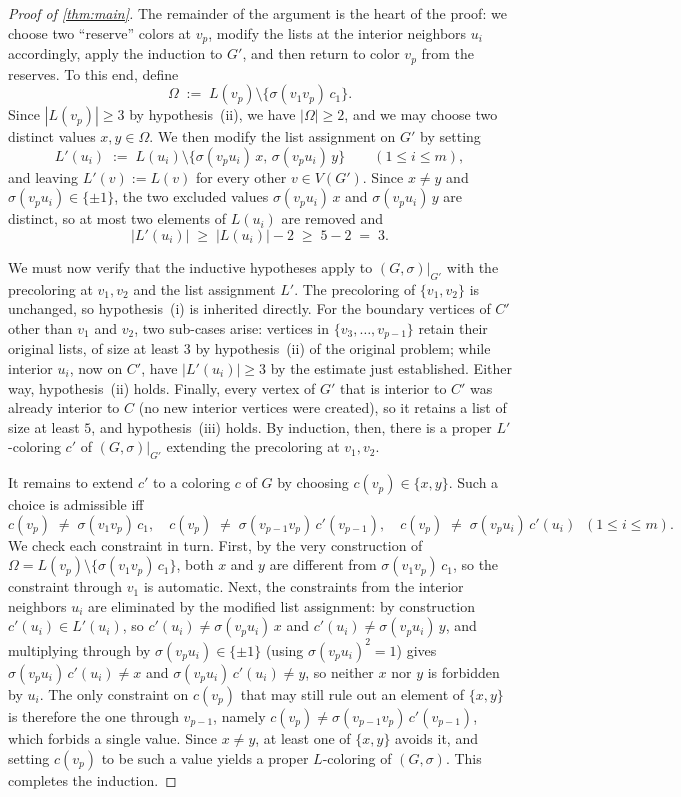 \documentclass[11pt,a4paper]{article}
\theoremstyle{plain}
\theoremstyle{definition}
\newcommand{\V}{V}
\newcommand{\Gs}{(G,\sigma)}
\begin{document}
\begin{proof}[Proof of \cref{thm:main}]
The remainder of the argument is the heart of the proof: we choose
two ``reserve'' colors at $v_p$, modify the lists at the interior
neighbors $u_i$ accordingly, apply the induction to $G'$, and then
return to color $v_p$ from the reserves. To this end, define
\[
   \Omega\;:=\;L(v_p)\setminus\{\sigma(v_1v_p)\,c_1\}.
\]
Since $|L(v_p)|\ge 3$ by hypothesis~(ii), we have $|\Omega|\ge 2$,
and we may choose two distinct values $x,y\in\Omega$. We then
modify the list assignment on $G'$ by setting
\[
   L'(u_i) \;:=\; L(u_i)\setminus\{\sigma(v_pu_i)\,x,\,\sigma(v_pu_i)\,y\}
   \qquad (1\le i\le m),
\]
and leaving $L'(v):=L(v)$ for every other $v\in\V(G')$. Since
$x\ne y$ and $\sigma(v_pu_i)\in\{\pm1\}$, the two excluded values
$\sigma(v_pu_i)\,x$ and $\sigma(v_pu_i)\,y$ are distinct, so at most
two elements of $L(u_i)$ are removed and
\[
   |L'(u_i)|\;\ge\;|L(u_i)|-2\;\ge\;5-2\;=\;3.
\]

We must now verify that the inductive hypotheses apply to
$\Gs|_{G'}$ with the precoloring at $v_1,v_2$ and the list
assignment $L'$. The precoloring of $\{v_1,v_2\}$ is unchanged, so
hypothesis~(i) is inherited directly. For the boundary vertices of
$C'$ other than $v_1$ and $v_2$, two sub-cases arise: vertices in
$\{v_3,\dots,v_{p-1}\}$ retain their original lists, of size at
least $3$ by hypothesis~(ii) of the original problem; while
interior $u_i$, now on $C'$, have $|L'(u_i)|\ge 3$ by the estimate
just established. Either way, hypothesis~(ii) holds. Finally, every
vertex of $G'$ that is interior to $C'$ was already interior to $C$
(no new interior vertices were created), so it retains a list of
size at least $5$, and hypothesis~(iii) holds. By induction, then,
there is a proper $L'$-coloring $c'$ of $\Gs|_{G'}$ extending the
precoloring at $v_1,v_2$.

It remains to extend $c'$ to a coloring $c$ of $G$ by choosing
$c(v_p)\in\{x,y\}$. Such a choice is admissible iff
\[
c(v_p)\;\ne\;\sigma(v_1v_p)\,c_1,\quad
c(v_p)\;\ne\;\sigma(v_{p-1}v_p)\,c'(v_{p-1}),\quad
c(v_p)\;\ne\;\sigma(v_pu_i)\,c'(u_i)\;\;(1\le i\le m).
\]
We check each constraint in turn. First, by the very construction
of $\Omega=L(v_p)\setminus\{\sigma(v_1v_p)\,c_1\}$, both $x$ and
$y$ are different from $\sigma(v_1v_p)\,c_1$, so the constraint
through $v_1$ is automatic. Next, the constraints from the interior
neighbors $u_i$ are eliminated by the modified list assignment: by
construction $c'(u_i)\in L'(u_i)$, so
$c'(u_i)\ne\sigma(v_pu_i)\,x$ and $c'(u_i)\ne\sigma(v_pu_i)\,y$,
and multiplying through by $\sigma(v_pu_i)\in\{\pm1\}$ (using
$\sigma(v_pu_i)^2=1$) gives $\sigma(v_pu_i)\,c'(u_i)\ne x$ and
$\sigma(v_pu_i)\,c'(u_i)\ne y$, so neither $x$ nor $y$ is forbidden
by $u_i$. The only constraint on $c(v_p)$ that may still rule out
an element of $\{x,y\}$ is therefore the one through $v_{p-1}$,
namely $c(v_p)\ne\sigma(v_{p-1}v_p)\,c'(v_{p-1})$, which forbids a
single value. Since $x\ne y$, at least one of $\{x,y\}$ avoids it,
and setting $c(v_p)$ to be such a value yields a proper $L$-coloring
of $\Gs$. This completes the induction.
\end{proof}
\end{document}
